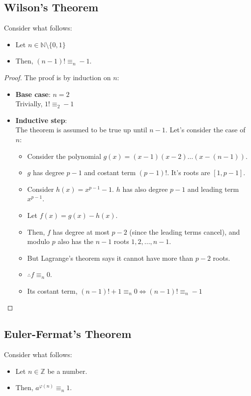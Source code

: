 \subsection{Wilson's Theorem}\label{wilson_th}
\begin{theorem}
    Consider what follows:
    \begin{itemize}
        \item Let $n \in \mathbb{N} \setminus \{0,1\}$
        \item Then, $(n-1)! \equiv_{n} -1$.
    \end{itemize}
\end{theorem}
\begin{proof}
    The proof is by induction on $n$:
    \begin{itemize}
        \item \textbf{Base case}: $n = 2$\\
        Trivially, $1! \equiv_{2} -1$
        \item \textbf{Inductive step}:\\
        The theorem is assumed to be true up until $n - 1$. Let's consider the case of $n$:\\
        \begin{itemize}
            \item Consider the polynomial $g(x) = (x-1)(x-2) \dots (x - (n-1))$.
            \item $g$ has degree $p-1$ and costant term $(p-1)!$. It's roots are $[1,p-1]$.
            \item Consider $h(x) = x^{p-1} - 1$. $h$ has also degree $p-1$ and leading term $x^{p-1}$.
            \item Let $f(x) = g(x) - h(x)$.
            \item Then, $f$ has degree at most $p - 2$ (since the leading terms cancel), and modulo $p$ also has the $n - 1$ roots $1, 2, ..., n - 1$.
            \item But Lagrange's theorem says it cannot have more than $p - 2$ roots.
            \item $\therefore f \equiv_{n} 0$.
            \item Its costant term, $(n-1)! + 1 \equiv_{n} 0 \iff (n-1)! \equiv_{n} -1$
        \end{itemize}
    \end{itemize}
\end{proof}

\subsection{Euler-Fermat's Theorem}\label{euler_fermat_th}
\begin{theorem}
    Consider what follows:
    \begin{itemize}
        \item Let $n \in \mathbb{Z}$ be a number.
        \item Then, $a^{\varphi(n)} \equiv_{n} 1$.
    \end{itemize}
\end{theorem}

